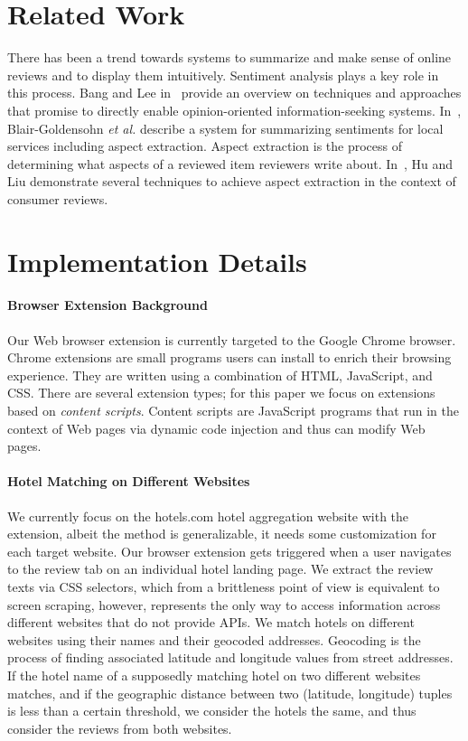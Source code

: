 \documentclass[runningheads,a4paper]{llncs}
\begin{document}
\section{Related Work}
There has been a trend towards systems to summarize and make sense of online reviews and to display them intuitively. Sentiment analysis plays a key role in this process. Bang and Lee in~\cite{pang2008} provide an overview on techniques and approaches that promise to directly enable opinion-oriented information-seeking systems. In~\cite{blairgoldensohn2011}, Blair-Goldensohn \emph{et al.} describe a system for summarizing sentiments for local services including aspect extraction. Aspect extraction is the process of determining what aspects of a reviewed item reviewers write about. In~\cite{hu2004}, Hu and Liu demonstrate several techniques to achieve aspect extraction in the context of consumer reviews.

\section{Implementation Details}
\paragraph{Browser Extension Background}
Our Web browser extension is currently targeted to the Google Chrome browser. Chrome extensions are small  programs users can install to enrich their browsing experience. They are written using a combination of HTML, JavaScript, and CSS. There are several extension types; for this paper we focus on extensions based on \emph{content scripts}. Content scripts are JavaScript programs that run in the context of Web pages via dynamic code injection and thus can modify Web pages.

\paragraph{Hotel Matching on Different Websites}
We currently focus on the hotels.com hotel aggregation website with the extension, albeit the method is generalizable, it needs some customization for each target website. Our browser extension gets triggered when a user navigates to the review tab on an individual hotel landing page. We extract the review texts via CSS selectors, which from a  brittleness point of view is equivalent to screen scraping, however, represents the only way to access information across different websites that do not provide APIs. We match hotels on different websites using their names and their geocoded addresses. Geocoding is the process of finding associated latitude and longitude values from street addresses. If the hotel name of a supposedly matching hotel on two different websites matches, and if the geographic distance between two (latitude, longitude) tuples is less than a certain threshold, we consider the hotels the same, and thus consider the reviews from both websites.
\end{document}
